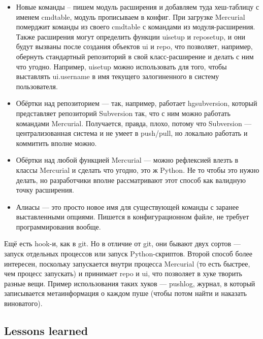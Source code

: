 \documentclass[a5paper]{article}
\begin{document}
\begin{itemize}
    \item Новые команды -- пишем модуль расширения и добавляем туда хеш-таблицу с именем cmdtable, модуль прописываем в конфиг. При загрузке Mercurial померджит команды из своего cmdtable с командами из модуля-расширения. Также расширения могут определить функции uisetup и reposetup, и они будут вызваны после создания объектов ui и repo, что позволяет, например, обернуть стандартный репозиторий в свой класс-расширение и делать с ним что угодно. Например, uisetup можно использовать для того, чтобы выставлять ui.username в имя текущего залогиненного в систему пользователя.
    \item Обёртки над репозиторием --- так, например, работает hgsubversion, который представляет репозиторий Subversion так, что с ним можно работать командами Mercurial. Получается, правда, плохо, потому что Subversion --- централизованная система и не умеет в push/pull, но локально работать и коммитить вполне можно.
    \item Обёртки над любой функцией Mercurial --- можно рефлексией влезть в классы Mercurial и сделать что угодно, это ж Python. Не то чтобы это нужно делать, но разработчики вполне рассматривают этот способ как валидную точку расширения.
    \item Алиасы --- это просто новое имя для существующей команды с заранее выставленными опциями. Пишется в конфигурационном файле, не требует программирования вообще.
\end{itemize}

Ещё есть hook-и, как в git. Но в отличие от git, они бывают двух сортов --- запуск отдельных процессов или запуск Python-скриптов. Второй способ более интересен, поскольку запускается внутри процесса Mercurial (то есть быстрее, чем процесс запускать) и принимает repo и ui, что позволяет в хуке творить разные вещи. Пример использования таких хуков --- pushlog, журнал, в который записывается метаинформация о каждом пуше (чтобы потом найти и наказать виноватого).

\subsection{Lessons learned}
\end{document}
